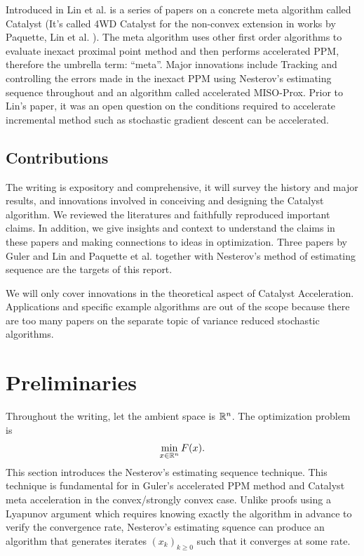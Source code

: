 \documentclass[12pt]{article}
\begin{document}
    Introduced in Lin et al. \cite{lin_universal_2015,lin_catalyst_2018} is a series of papers on a concrete meta algorithm called Catalyst (It's called 4WD Catalyst for the non-convex extension in works by Paquette, Lin et al. \cite{paquette_catalyst_2018}). 
    The meta algorithm uses other first order algorithms to evaluate inexact proximal point method and then performs accelerated PPM, therefore the umbrella term: ``meta''. 
    Major innovations include Tracking and controlling the errors made in the inexact PPM using Nesterov's estimating sequence throughout and an algorithm called accelerated MISO-Prox.  
    Prior to Lin's paper, it was an open question on the conditions required to accelerate incremental method such as stochastic gradient descent can be accelerated. 

    \subsection{Contributions}
        The writing is expository and comprehensive, it will survey the history and major results, and innovations involved in conceiving and designing the Catalyst algorithm. 
        We reviewed the literatures and faithfully reproduced important claims.
        In addition, we give insights and context to understand the claims in these papers and making connections to ideas in optimization. 
        Three papers by Guler \cite{guler_new_1992} and Lin \cite{lin_universal_2015} and Paquette et al. \cite{lin_catalyst_2018} together with Nesterov's \cite{nesterov_lectures_2018} method of estimating sequence are the targets of this report. 

        We will only cover innovations in the theoretical aspect of Catalyst Acceleration. 
        Applications and specific example algorithms are out of the scope because there are too many papers on the separate topic of variance reduced stochastic algorithms. 

\section{Preliminaries}\label{sec:preliminaries}
    Throughout the writing, let the ambient space is $\mathbb R^n$. 
    The optimization problem is
    \begin{align*}
        \min_{x \in \mathbb R^n} F(x). 
    \end{align*}
    This section introduces the Nesterov's estimating sequence technique. 
    This technique is fundamental for in Guler's accelerated PPM method and Catalyst meta acceleration in the convex/strongly convex case. 
    Unlike proofs using a Lyapunov argument which requires knowing exactly the algorithm in advance to verify the convergence rate, Nesterov's estimating squence can produce an algorithm that generates iterates $(x_k)_{k \ge0}$ such that it converges at some rate. 
\end{document}
